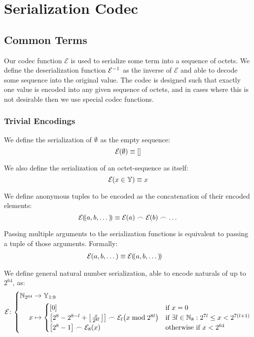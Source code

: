 \section{Serialization Codec}\label{sec:serialization}

\subsection{Common Terms}

Our codec function $\mathcal{E}$ is used to serialize some term into a sequence of octets. We define the deserialization function $\mathcal{E}^{-1}_{}$ as the inverse of $\mathcal{E}$ and able to decode some sequence into the original value. The codec is designed such that exactly one value is encoded into any given sequence of octets, and in cases where this is not desirable then we use special codec functions.

\subsubsection{Trivial Encodings}
We define the serialization of $\emptyset$ as the empty sequence:
\begin{equation}
  \encode{\none} \equiv \sq{}
\end{equation}

We also define the serialization of an octet-sequence as itself:
\begin{equation}
  \encode{x \in \blob} \equiv x
\end{equation}

We define anonymous tuples to be encoded as the concatenation of their encoded elements:
\begin{equation}
  \encode{\tup{a, b, \dots}} \equiv \encode{a} \concat \encode{b} \concat \dots
\end{equation}

Passing multiple arguments to the serialization functions is equivalent to passing a tuple of those arguments. Formally:
\begin{align}
  \encode{a, b, \dots} &\equiv \encode{\tup{a, b, \dots}}
\end{align}

We define general natural number serialization, able to encode naturals of up to $2^{64}$, as:
\begin{equation}
  \fnencode\colon\abracegroup{
    \Nbits{64} &\to \bloboflen{1:9} \\
    x &\mapsto \begin{cases}
     \sq{0} &\when x = 0 \\
      \sq{2^8-2^{8-l} + \ffrac{x}{2^{8l}}} \concat \encode[l]{x \bmod 2^{8l}} &\when \exists l \in \N_8 : 2^{7l} \le x < 2^{7(l+1)} \\
     \sq{2^8-1} \concat \encode[8]{x} &\otherwhen x < 2^{64} \\
    \end{cases}
  }
\end{equation}

